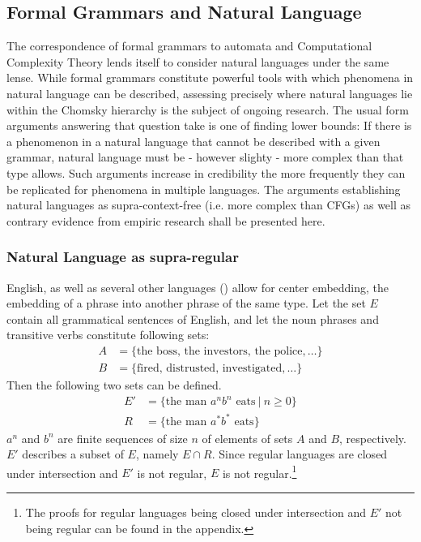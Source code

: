 \subsection{Formal Grammars and Natural Language}
The correspondence of formal grammars to automata and Computational Complexity Theory lends itself to consider natural languages under the same lense. While formal grammars constitute powerful tools with which phenomena in natural language can be described, assessing precisely where natural languages lie within the Chomsky hierarchy is the subject of ongoing research.
The usual form arguments answering that question take is one of finding lower bounds: If there is a phenomenon in a natural language that cannot be described with a given grammar, natural language must be - however slighty - more complex than that type allows. Such arguments increase in credibility the more frequently they can be replicated for phenomena in multiple languages. The arguments establishing natural languages as supra-context-free (i.e. more complex than CFGs) as well as contrary evidence from empiric research shall be presented here.

\subsubsection{Natural Language as supra-regular}\label{supraReg}
English, as well as several other languages (\cite{Hagege1976}) allow for center embedding, the embedding of a phrase into another phrase of the same type.
Let the set $E$ contain all grammatical sentences of English, and let the noun phrases and transitive verbs constitute following sets:
\begin{align*}
A &= \lbrace \text{the boss}, \, \text{the investors}, \, \text{the police}, \dots \rbrace \\
B &= \lbrace \text{fired}, \, \text{distrusted}, \, \text{investigated}, \dots \rbrace
\end{align*}
Then the following two sets can be defined.
\begin{align*}
E' &= \lbrace \text{the man } a^{n}b^{n} \text{ eats} \: \vert \: n \geq 0 \rbrace \\
R &= \lbrace \text{the man } a^{*}b^{*} \text{ eats} \rbrace
\end{align*}
$a^{n}$ and $b^{n}$ are finite sequences of size $n$ of elements of sets $A$ and $B$, respectively. $E'$ describes a subset of $E$, namely $E \cap R$. Since regular languages are closed under intersection and $E'$ is not regular, $E$ is not regular.\footnote{The proofs for regular languages being closed under intersection and $E'$ not being regular can be found in the appendix.}

